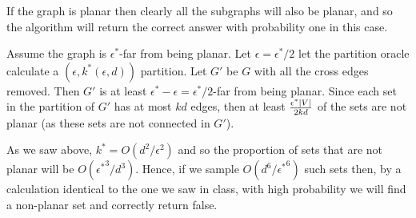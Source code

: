 \documentclass[11pt]{article} \usepackage{amssymb}
\newcommand{\eps}{\epsilon} \newcommand{\lam}{\lambda}
\begin{document}
\begin{enumerate}
  If the graph is planar then clearly all the subgraphs will also be
  planar, and so the algorithm will return the correct answer with
  probability one in this case.

  Assume the graph is $\eps^*$-far from being planar. Let
  $\eps=\eps^*/2$ let the partition oracle calculate a $(\eps,
  k^*(\eps, d))$ partition. Let $G'$ be $G$ with all the cross edges
  removed. Then $G'$ is at least $\eps^*-\eps=\eps^*/2$-far from being
  planar. Since each set in the partition of $G'$ has at most $kd$
  edges, then at least ${\eps^*|V| \over 2kd}$ of the sets are not
  planar (as these sets are not connected in $G'$).

  As we saw above, $k^*=O(d^2/\eps^2)$ and so the proportion of sets
  that are not planar will be $O({\eps^*}^3/d^3)$. Hence, if we sample
  $O(d^6/{\eps^*}^6)$ such sets then, by a calculation identical to the
  one we saw in class, with high probability we will find a non-planar
  set and correctly return false.
  
\end{enumerate}
\end{document}
